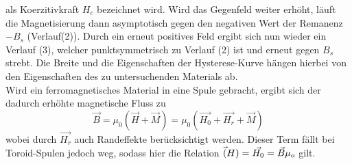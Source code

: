 als Koerzitivkraft $H_c $ bezeichnet wird. Wird das Gegenfeld weiter erhöht, läuft die
Magnetisierung dann asymptotisch gegen den negativen Wert der Remanenz $-B_s$ (Verlauf(2)).
Durch ein erneut positives Feld ergibt sich nun wieder ein Verlauf (3), welcher punktsymmetrisch
zu Verlauf (2) ist und erneut gegen $B_s$ strebt.
Die Breite und die Eigenschaften der Hysterese-Kurve hängen hierbei von den
Eigenschaften des zu untersuchenden Materials ab.\\
\noindent
Wird ein ferromagnetisches Material in eine Spule gebracht, ergibt sich der dadurch
erhöhte magnetische Fluss zu
\begin{equation}
  \vec{B}= \mu_0 (\vec{H}+\vec{M}) = \mu_0 (\vec{H_0}+ \vec{H_r} +\vec{M})
\end{equation}
wobei durch $\vec{H_r}$ auch Randeffekte berücksichtigt werden. Dieser Term fällt
bei Toroid-Spulen jedoch weg, sodass hier die Relation $\vec(H) = \vec{H_0} =
\vec{B}\/ \mu_o $ gilt.
